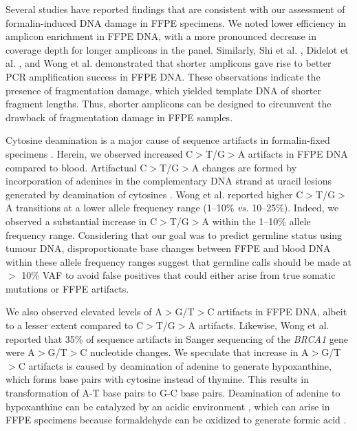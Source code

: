 \documentclass{bmcart}
\begin{document}
Several studies have reported findings that are consistent with our assessment of formalin-induced DNA damage in FFPE specimens. We noted lower efficiency in amplicon enrichment in FFPE DNA, with a more pronounced decrease in coverage depth for longer amplicons in the panel. Similarly, Shi et al. \cite{Shi2002}, Didelot et al. \cite{Didelot2013}, and Wong et al. \cite{Wong2013} demonstrated that shorter amplicons gave rise to better PCR amplification success in FFPE DNA. These observations indicate the presence of fragmentation damage, which yielded template DNA of shorter fragment lengths. Thus, shorter amplicons can be designed to circumvent the drawback of fragmentation damage in FFPE samples.

Cytosine deamination is a major cause of sequence artifacts in formalin-fixed specimens \cite{Wong2014, Do2012, Oh2015, Spencer2013, Do2013, Kim2017, Chen2014}. Herein, we observed increased C$>$T/G$>$A artifacts in FFPE DNA compared to blood. Artifactual C$>$T/G$>$A changes are formed by incorporation of adenines in the complementary DNA strand at uracil lesions generated by deamination of cytosines \cite{Do2015a}. Wong et al. \cite{Wong2014} reported higher C$>$T/G$>$A transitions at a lower allele frequency range (1--10\% \textit{vs.} 10--25\%). Indeed, we observed a substantial increase in C$>$T/G$>$A within the 1--10\% allele frequency range. Considering that our goal was to predict germline status using tumour DNA, disproportionate base changes between FFPE and blood DNA within these allele frequency ranges suggest that germline calls should be made at $>$ 10\% VAF to avoid false positives that could either arise from true somatic mutations or FFPE artifacts.

We also observed elevated levels of A$>$G/T$>$C artifacts in FFPE DNA, albeit to a lesser extent compared to C$>$T/G$>$A artifacts. Likewise, Wong et al. \cite{Wong1998} reported that 35\% of sequence artifacts in Sanger sequencing of the \textit{BRCA1} gene were A$>$G/T$>$C nucleotide changes. We speculate that increase in A$>$G/T$>$C artifacts is caused by deamination of adenine to generate hypoxanthine, which forms base pairs with cytosine instead of thymine. This results in transformation of A-T base pairs to G-C base pairs. Deamination of adenine to hypoxanthine can be catalyzed by an acidic environment \cite{Wang2010}, which can arise in FFPE specimens because formaldehyde can be oxidized to generate formic acid \cite{Do2015a}.
\end{document}
